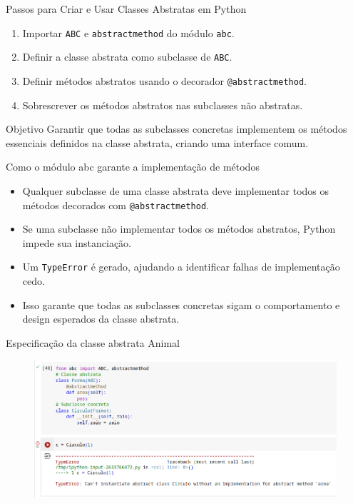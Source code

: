 \begin{frame}{Passos para Criar e Usar Classes Abstratas em Python}

    \begin{enumerate}
        \item Importar \texttt{ABC} e \texttt{abstractmethod} do módulo \texttt{abc}.
        \item Definir a classe abstrata como subclasse de \texttt{ABC}.
        \item Definir métodos abstratos usando o decorador \texttt{@abstractmethod}.
        \item Sobrescrever os métodos abstratos nas subclasses não abstratas.
    \end{enumerate}

    \begin{block}{Objetivo}
        Garantir que todas as subclasses concretas implementem os métodos essenciais definidos na classe abstrata, criando uma interface comum.
    \end{block}

\end{frame}

\begin{frame}{Como o módulo abc garante a implementação de métodos}
    \begin{itemize}
        \item Qualquer subclasse de uma classe abstrata deve implementar todos os métodos decorados com \texttt{@abstractmethod}.
        \item Se uma subclasse não implementar todos os métodos abstratos, Python impede sua instanciação.
        \item Um \texttt{TypeError} é gerado, ajudando a identificar falhas de implementação cedo.
        \item Isso garante que todas as subclasses concretas sigam o comportamento e design esperados da classe abstrata.
    \end{itemize}
\end{frame}

\begin{frame}{Especificação da classe abstrata Animal}
    \begin{figure}
        \centering
        \includegraphics[width=\linewidth]{Images/classe-abstrata-erro.png}

        \label{fig:placeholder}
    \end{figure}
\end{frame}



